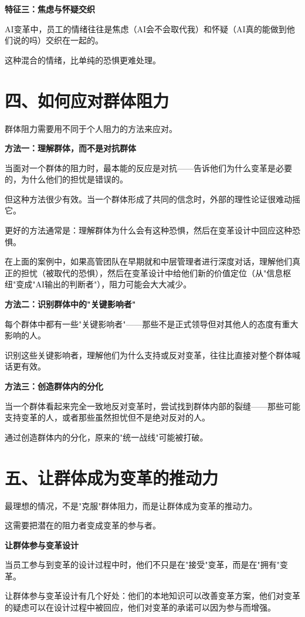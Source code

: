 \textbf{特征三：焦虑与怀疑交织}

AI变革中，员工的情绪往往是焦虑（AI会不会取代我）和怀疑（AI真的能做到他们说的吗）交织在一起的。

这种混合的情绪，比单纯的恐惧更难处理。

\section{四、如何应对群体阻力}


群体阻力需要用不同于个人阻力的方法来应对。

\textbf{方法一：理解群体，而不是对抗群体}

当面对一个群体的阻力时，最本能的反应是对抗——告诉他们为什么变革是必要的，为什么他们的担忧是错误的。

但这种方法很少有效。当一个群体形成了共同的信念时，外部的理性论证很难动摇它。

更好的方法通常是：理解群体为什么会有这种恐惧，然后在变革设计中回应这种恐惧。

在上面的案例中，如果高管团队在早期就和中层管理者进行深度对话，理解他们真正的担忧（被取代的恐惧），然后在变革设计中给他们新的价值定位（从"信息枢纽"变成"AI输出的判断者"），阻力可能会大大减少。

\textbf{方法二：识别群体中的"关键影响者"}

每个群体中都有一些"关键影响者"——那些不是正式领导但对其他人的态度有重大影响的人。

识别这些关键影响者，理解他们为什么支持或反对变革，往往比直接对整个群体喊话更有效。

\textbf{方法三：创造群体内的分化}

当一个群体看起来完全一致地反对变革时，尝试找到群体内部的裂缝——那些可能支持变革的人，或者那些虽然担忧但不是绝对反对的人。

通过创造群体内的分化，原来的"统一战线"可能被打破。

\section{五、让群体成为变革的推动力}


最理想的情况，不是"克服"群体阻力，而是让群体成为变革的推动力。

这需要把潜在的阻力者变成变革的参与者。

\textbf{让群体参与变革设计}

当员工参与到变革的设计过程中时，他们不只是在"接受"变革，而是在"拥有"变革。

让群体参与变革设计有几个好处：他们的本地知识可以改善变革方案，他们对变革的疑虑可以在设计过程中被回应，他们对变革的承诺可以因为参与而增强。

